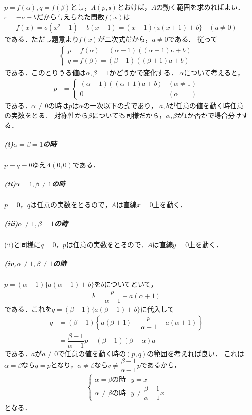 \documentclass[../../main.tex]{subfiles}
\begin{document}
$p=f(\alpha), q=f(\beta)$とし，$A(p,q)$とおけば，$A$の動く範囲を求めればよい．
$c=-a-b$だから与えられた関数$f(x)$は
\begin{align}
  f(x)=a(x^2-1)+b(x-1)=(x-1)\{a(x+1)+b\} \quad (a\neq 0) \label{eq:1}
\end{align}
である．ただし題意より$f(x)$が二次式だから，$a \neq 0$である．
従って
\begin{align}
  \begin{cases}
    p = f(\alpha) = (\alpha-1)((\alpha+1)a + b) \\
    q = f(\beta) = (\beta-1)((\beta+1)a + b)
  \end{cases}
\end{align}
である．このとりうる値は$\alpha,\beta=1$かどうかで変化する．
$\alpha$について考えると，
\begin{align}
  p &=
  \begin{cases}
    (\alpha-1)((\alpha+1)a + b) & (\alpha \neq 1)\\
    0 & (\alpha=1)
  \end{cases}
\end{align}
である．$\alpha \neq 0$の時は$p$は$\alpha$の一次以下の式であり，
$a,b$が任意の値を動く時任意の実数をとる．
対称性から$\beta$についても同様だから，$\alpha, \beta$が$1$か否かで場合分けする．

\subparagraph{(i)$\alpha=\beta=1$の時}

$p=q=0$ゆえ$A(0,0)$である．

\subparagraph{(ii)$\alpha=1,\beta\not=1$の時}

$p=0$，$q$は任意の実数をとるので，$A$は直線$x=0$上を動く．

\subparagraph{(iii)$\alpha\not=1,\beta=1$の時}

(ii)と同様に$q=0$，$p$は任意の実数をとるので，$A$は直線$y=0$上を動く．

\subparagraph{(iv)$\alpha\not=1,\beta\not=1$の時}

$p=(\alpha-1)\{a(\alpha+1)+b\}$を$b$についてといて，
\begin{align}
  b=\dfrac{p}{\alpha-1}-a(\alpha+1) \tag{$\because \alpha\not=1$}
\end{align}
である．これを$q=(\beta-1)\{a(\beta+1)+b\}$に代入して
\begin{align}
  q&=(\beta-1)\left\{a(\beta+1)+\dfrac{p}{\alpha-1}-a(\alpha+1)\right\} \\
  &=\dfrac{\beta-1}{\alpha-1}p+(\beta-1)(\beta-\alpha)a
\end{align}
である．$a$が$a\neq 0$で任意の値を動く時の$(p,q)$の範囲を考えれば良い．
これは$\alpha=\beta$なら$q=p$となり，$\alpha\not=\beta$なら$q\not=\dfrac{\beta-1}{\alpha-1}p$であるから，
\begin{align}
  \begin{cases}
    \alpha=\beta\text{の時}&y=x \\
    \alpha\not=\beta\text{の時}&y\neq \dfrac{\beta-1}{\alpha-1}x
  \end{cases}
\end{align}
となる．
\casesend
\end{document}
